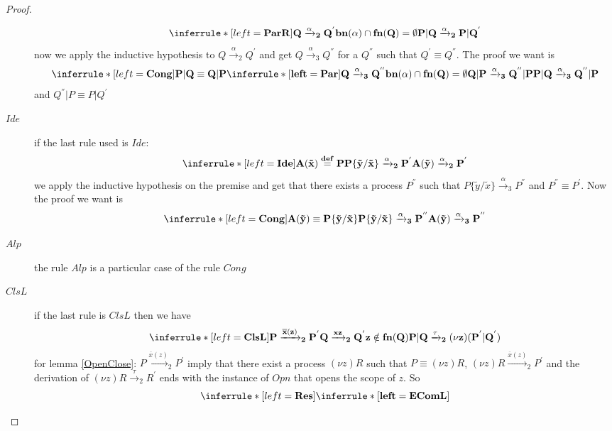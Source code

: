 \begin{lemma}
\begin{proof}
\begin{description}
		\[
		  \inferrule* [left=\bf{ParR}]{
		      Q\xrightarrow{\alpha}_{2}Q^{'}
		    \\
		      bn(\alpha)\cap fn(Q)=\emptyset
		  }{
		      P|Q\xrightarrow{\alpha}_{2}P|Q^{'}
		  }
		\]	
		now we apply the inductive hypothesis to $Q\xrightarrow{\alpha}_{2}Q^{'}$ and get $Q\xrightarrow{\alpha}_{3}Q^{''}$ for a $Q^{''}$ such that $Q^{'}\equiv Q^{''}$. The proof we want is
		\[
		  \inferrule* [left=\bf{Cong}]{
		      P|Q\equiv Q|P
		    \\
		      \inferrule* [left=\bf{Par}]{
			  Q\xrightarrow{\alpha}_{3}Q^{''}
			\\
			  bn(\alpha)\cap fn(Q)=\emptyset
		      }{
			  Q|P\xrightarrow{\alpha}_{3}Q^{''}|P
		      }
		    }{
		      P|Q\xrightarrow{\alpha}_{3}Q^{''}|P
		    }
		\]
		and $Q^{''}|P\equiv P|Q^{'}$
      \item[$Ide$]
		if the last rule used is $Ide$:
		\[
		    \inferrule* [left=\bf{Ide}]{
			A(\tilde{x}) \stackrel{def}{=} P
		      \\
			P\{\tilde{y}/\tilde{x}\} \xrightarrow{\alpha}_{2} P^{'}
		    }{
		      A(\tilde{y}) \xrightarrow{\alpha}_{2} P^{'}
		    }
		\]
		we apply the inductive hypothesis on the premise and get that there exists a process $P^{''}$ such that $P\{\tilde{y}/\tilde{x}\}\xrightarrow{\alpha}_{3}P^{''}$ and $P^{''}\equiv P^{'}$. Now the proof we want is
		\[
		    \inferrule* [left=\bf{Cong}]{
			A(\tilde{y}) \equiv P\{\tilde{y}/\tilde{x}\}
		      \\
			P\{\tilde{y}/\tilde{x}\}\xrightarrow{\alpha}_{3}P^{''}
		    }{
		      A(\tilde{y})\xrightarrow{\alpha}_{3}P^{''}
		    }
		\]		
      \item[$Alp$]
	the rule $Alp$ is a particular case of the rule $Cong$
      \item[$ClsL$]
	if the last rule is $ClsL$ then we have
		\[
		    \inferrule* [left=\bf{ClsL}]{
			P\xrightarrow{\overline{x}(z)}_{2}P^{'}
		      \\
			Q\xrightarrow{xz}_{2}Q^{'}
		      \\
			z\notin fn(Q)
		    }{
		      P|Q\xrightarrow{\tau}_{2}(\nu z)(P^{'}|Q^{'})
		    }
		\]
	for lemma \ref{OpenClose}: $P\xrightarrow{\overline{x}(z)}_{2}P^{'}$ imply that there exist a process $(\nu z)R$ such that $P \equiv (\nu z)R$, $(\nu z)R \xrightarrow{\overline{x}(z)}_{2} P^{'}$ and the derivation of $(\nu z)R \xrightarrow{\tau}_{2} R^{'}$ ends with the instance of $Opn$ that opens the scope of $z$. So 
		\[
		  \inferrule* [left=\bf{Res}]{
		    \inferrule* [left=\bf{EComL}]{
}}\]
\end{description}
\end{proof}
\end{lemma}
